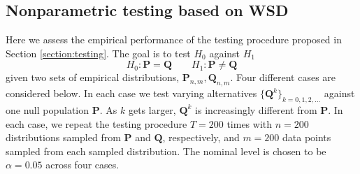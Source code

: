 \documentclass{imsart}
\numberwithin{equation}{section}
\begin{document}
\subsection{Nonparametric testing based on WSD} \label{subsection:simulation:test} 
Here we assess the empirical performance of the testing procedure proposed in Section \ref{section:testing}. The goal is to test $H_0$ against $H_1$ 
\begin{equation*}
	H_0: \mathbf{P}=\mathbf{Q}  \qquad H_1: \mathbf{P}\neq\mathbf{Q}
\end{equation*}
given two sets of empirical distributions, $\mathbf{P}_{n,m}, \mathbf{Q}_{n,m}$. 
Four different cases are considered below. In each case we test varying alternatives $\{ \mathbf{Q}^k\}_{k=0,1,2,\ldots}$ against one null population $\mathbf{P}$. As $k$ gets larger, $\mathbf{Q}^k$ is increasingly different from $\mathbf{P}$.
In each case, we repeat the testing procedure $T=200$ times with $n=200$ distributions sampled from $\mathbf{P}$ and $\mathbf{Q}$, respectively, and $m=200$ data points sampled from each sampled distribution.  
The nominal level is chosen to be $\alpha = 0.05$ across four cases. 
\end{document}
